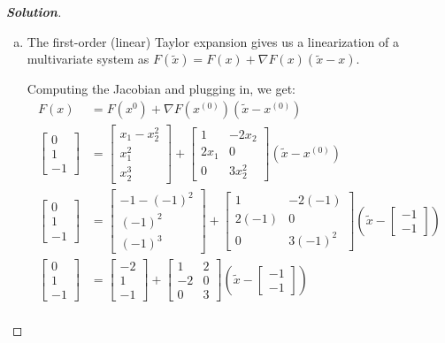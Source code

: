 \documentclass[11pt]{article}
\newenvironment{solution}{%
  \begin{proof}[\textbf{Solution}]$ $\par\nobreak\ignorespaces
}{%
  \end{proof}
}
\theoremstyle{definition}
\begin{document}
\begin{solution}
\begin{enumerate}[(a)]
\item The first-order (linear) Taylor expansion gives us a linearization of a multivariate system as $F(\tilde{x}) = F(x) + \nabla F(x)(\tilde{x} - x)$.

Computing the Jacobian and plugging in, we get:
\begin{align*}
    F(x) &= F(x^{0}) + \nabla F(x^{(0)})(\tilde{x} - x^{(0)}) \\
    \begin{bmatrix*}0 \\ 1 \\ -1\end{bmatrix*} &= \begin{bmatrix*}x_1 - x_2^2 \\ x_1^2 \\ x_2^3\end{bmatrix*} + \begin{bmatrix*}1 & -2x_2 \\2x_1 & 0 \\ 0 & 3x_2^2\end{bmatrix*}\left(\tilde{x} - x^{(0)}\right) \\
    \begin{bmatrix*}0 \\ 1 \\ -1\end{bmatrix*} &= \begin{bmatrix*}-1 - (-1)^2 \\ (-1)^2 \\ (-1)^3\end{bmatrix*} + \begin{bmatrix*}1 & -2(-1) \\ 2(-1) & 0 \\ 0 & 3(-1)^2\end{bmatrix*}\left(\tilde{x} - \begin{bmatrix*}-1 \\ -1\end{bmatrix*}\right) \\
    \begin{bmatrix*}0 \\ 1 \\ -1\end{bmatrix*} &= \begin{bmatrix*}-2 \\ 1 \\ -1\end{bmatrix*} + \begin{bmatrix*}1 & 2 \\ -2 & 0 \\ 0 & 3\end{bmatrix*}\left(\tilde{x} - \begin{bmatrix*}-1 \\ -1\end{bmatrix*}\right) \\

\end{align*}
\end{enumerate}
\end{solution}
\end{document}
